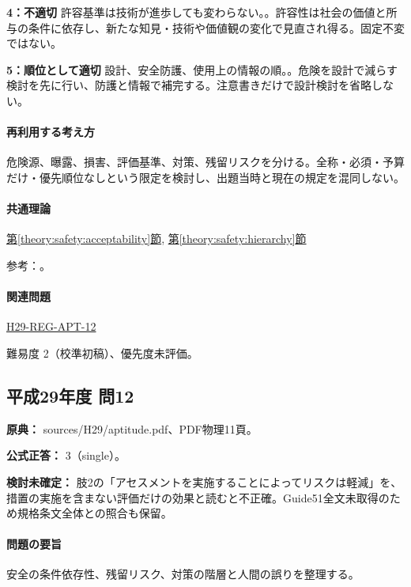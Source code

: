\noindent\textbf{4：不適切} 許容基準は技術が進歩しても変わらない。。許容性は社会の価値と所与の条件に依存し、新たな知見・技術や価値観の変化で見直され得る。固定不変ではない。\par

\noindent\textbf{5：順位として適切} 設計、安全防護、使用上の情報の順。。危険を設計で減らす検討を先に行い、防護と情報で補完する。注意書きだけで設計検討を省略しない。\par

\paragraph{再利用する考え方} 危険源、曝露、損害、評価基準、対策、残留リスクを分ける。全称・必須・予算だけ・優先順位なしという限定を検討し、出題当時と現在の規定を混同しない。

\paragraph{共通理論} \hyperref[theory:safety:acceptability]{第\ref*{theory:safety:acceptability}節}, \hyperref[theory:safety:hierarchy]{第\ref*{theory:safety:hierarchy}節}

\par 参考：\cite{saf_guide51,saf_ra2006}。

\paragraph{関連問題} \hyperref[q:h29-reg-apt-12]{H29-REG-APT-12}

\par 難易度 2（校準初稿）、優先度未評価。

\subsection{平成29年度 問12}
\label{q:h29-reg-apt-12}

\noindent\textbf{原典：} sources/H29/aptitude.pdf、PDF物理11頁。

\textbf{公式正答：} 3（single）。

\par\textbf{検討未確定：} 肢2の「アセスメントを実施することによってリスクは軽減」を、措置の実施を含まない評価だけの効果と読むと不正確。Guide51全文未取得のため規格条文全体との照合も保留。

\paragraph{問題の要旨} 安全の条件依存性、残留リスク、対策の階層と人間の誤りを整理する。

